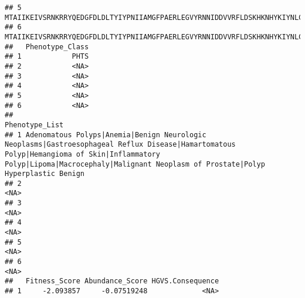 \documentclass[
]{article}
\begin{document}
\begin{verbatim}
## 5 MTAIIKEIVSRNKRRYQEDGFDLDLTYIYPNIIAMGFPAERLEGVYRNNIDDVVRFLDSKHKNHYKIYNLCAERHYDTAKFNCRVAQYPFEDHNPPQLELIKPFCEDLDQWLSEDDNHVAAIHCKAGKGRTGVMICAYLLHRGKFLKAQEALDFYGEVRTRDKKGVTIPSQRRYVYYYSYLLKNHLDYRPVALLFHKMMFETIPMFSGGTCNPQFVVCQLKVKIYSSNSGPTRREDKFMYFEFPQPLPVCGDIKVEFFHKQNKMLKKDKMFHFWVNTFFIPGPEETSEKVENGSLCDQEIDSICSIERADNDKEYLVLTLTKNDLDKANKDKANRYFSPNFKVKLYFTKTVEEPSNPEASSSTSVTPDVSDNEPDHYRYSDTTDSDPENEPFDEDQHTQITKV
## 6 MTAIIKEIVSRNKRRYQEDGFDLDLTYIYPNIIAMGFPAERLEGVYRNNIDDVVRFLDSKHKNHYKIYNLCAERHYDTAKFNCRVAQYPFEDHNPPQLELIKPFCEDLDQWLSEDDNHVAAIHCKAGKGRTGVMICAYLLHRGKFLKAQEALDFYGEVRTRDKKGVTIPSQRRYVYYYSYLLKNHLDYRPVALLFHKMMFETIPMFSGGTCNPQFVVCQLKVKIYSSNSGPTRREDKFMYFEFPQPLPVCGDIKVEFFHKQNKMLKKDKMFHFWVNTFFIPGPEETSEKVENGSLCDQEIDSICSIERADNDKEYLVLTLTKNDLDKANKDKANRYFSPNFKVKLYFTKTVEEPSNPEASSSTSVTPDVSDNEPDHYRYSDTTDSDPENEPFDEDQHTQITKV
##   Phenotype_Class
## 1            PHTS
## 2            <NA>
## 3            <NA>
## 4            <NA>
## 5            <NA>
## 6            <NA>
##                                                                                                                                                                                                                 Phenotype_List
## 1 Adenomatous Polyps|Anemia|Benign Neurologic Neoplasms|Gastroesophageal Reflux Disease|Hamartomatous Polyp|Hemangioma of Skin|Inflammatory Polyp|Lipoma|Macrocephaly|Malignant Neoplasm of Prostate|Polyp Hyperplastic Benign
## 2                                                                                                                                                                                                                         <NA>
## 3                                                                                                                                                                                                                         <NA>
## 4                                                                                                                                                                                                                         <NA>
## 5                                                                                                                                                                                                                         <NA>
## 6                                                                                                                                                                                                                         <NA>
##   Fitness_Score Abundance_Score HGVS.Consequence
## 1     -2.093857     -0.07519248             <NA>

\end{verbatim}
\end{document}
